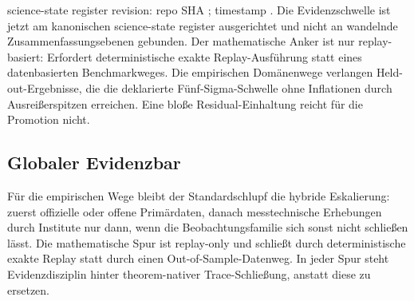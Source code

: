 science-state register revision: repo SHA ; timestamp .
Die Evidenzschwelle ist jetzt am kanonischen science-state register ausgerichtet und nicht an wandelnde Zusammenfassungsebenen gebunden. Der mathematische Anker ist nur replay-basiert: Erfordert deterministische exakte Replay-Ausführung statt eines datenbasierten Benchmarkweges. Die empirischen Domänenwege verlangen Held-out-Ergebnisse, die die deklarierte Fünf-Sigma-Schwelle ohne Inflationen durch Ausreißerspitzen erreichen. Eine bloße Residual-Einhaltung reicht für die Promotion nicht.

\subsection{Globaler Evidenzbar}
Für die empirischen Wege bleibt der Standardschlupf die hybride Eskalierung: zuerst offizielle oder offene Primärdaten, danach messtechnische Erhebungen durch Institute nur dann, wenn die Beobachtungsfamilie sich sonst nicht schließen lässt. Die mathematische Spur ist replay-only und schließt durch deterministische exakte Replay statt durch einen Out-of-Sample-Datenweg. In jeder Spur steht Evidenzdisziplin hinter theorem-nativer Trace-Schließung, anstatt diese zu ersetzen.

